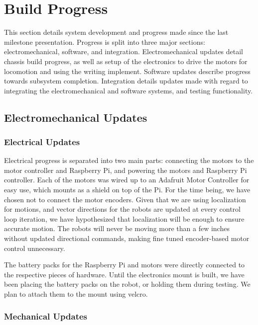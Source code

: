 
\section{Build Progress}
\label{sec:build_progress}

This section details system development and progress made since the last milestone presentation. Progress is split into three major sections: electromechanical, software, and integration. Electromechanical updates detail chassis build progress, as well as setup of the electronics to drive the motors for locomotion and using the writing implement. Software updates describe progress towards subsystem completion. Integration details updates made with regard to integrating the electromechanical and software systems, and testing functionality.

\subsection{Electromechanical Updates}
\label{sec:electromechanical_progress}

\subsubsection{Electrical Updates}
\label{sec:electrical_progress}
Electrical progress is separated into two main parts: connecting the motors to the motor controller and Raspberry Pi, and powering the motors and Raspberry Pi controller. Each of the motors was wired up to an Adafruit Motor Controller for easy use, which mounts as a shield on top of the Pi. For the time being, we have chosen not to connect the motor encoders. Given that we are using localization for motions, and vector directions for the robots are updated at every control loop iteration, we have hypothesized that localization will be enough to ensure accurate motion. The robots will never be moving more than a few inches without updated directional commands, making fine tuned encoder-based motor control unnecessary.

The battery packs for the Raspberry Pi and motors were directly connected to the respective pieces of hardware. Until the electronics mount is built, we have been placing the battery packs on the robot, or holding them during testing. We plan to attach them to the mount using velcro.

\subsubsection{Mechanical Updates}
\label{sec:mechanical_progress}

